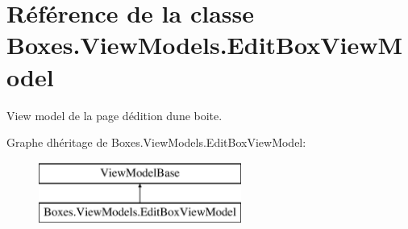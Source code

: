 \hypertarget{class_boxes_1_1_view_models_1_1_edit_box_view_model}{}\section{Référence de la classe Boxes.\+View\+Models.\+Edit\+Box\+View\+Model}
\label{class_boxes_1_1_view_models_1_1_edit_box_view_model}


View model de la page d\textquotesingle{}édition d\textquotesingle{}une boite.  


Graphe d\textquotesingle{}héritage de Boxes.\+View\+Models.\+Edit\+Box\+View\+Model\+:\begin{figure}[H]
\begin{center}
\leavevmode
\includegraphics[height=2.000000cm]{class_boxes_1_1_view_models_1_1_edit_box_view_model}
\end{center}
\end{figure}
